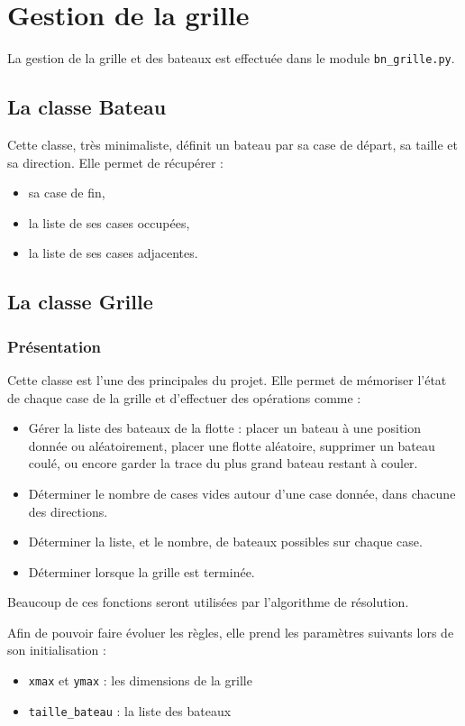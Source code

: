 \chapter{Gestion de la grille}

La gestion de la grille et des bateaux est effectuée dans le module \texttt{bn\_grille.py}.

\section{La classe Bateau}
Cette classe, très minimaliste, définit un bateau par sa case de départ, sa taille et sa direction. Elle permet de récupérer :
\begin{itemize}
\item sa case de fin,
\item la liste de ses cases occupées,
\item la liste de ses cases adjacentes.
\end{itemize}

\section{La classe Grille}
\subsection{Présentation}
Cette classe est l'une des principales du projet. 
Elle permet de mémoriser l'état de chaque case de la grille et d'effectuer des opérations comme :
\begin{itemize}
\item Gérer la liste des bateaux de la flotte : placer un bateau à une position donnée ou aléatoirement, placer une flotte aléatoire, supprimer un bateau coulé, ou encore garder la trace du plus grand bateau restant à couler.
\item Déterminer le nombre de cases vides autour d'une case donnée, dans chacune des directions.
\item Déterminer la liste, et le nombre, de bateaux possibles sur chaque case.
\item Déterminer lorsque la grille est terminée.
\end{itemize}
Beaucoup de ces fonctions seront utilisées par l'algorithme de résolution.

Afin de pouvoir faire évoluer les règles, elle prend les paramètres suivants lors de son initialisation :
\begin{itemize}
\item \texttt{xmax} et \texttt{ymax} : les dimensions de la grille
\item \texttt{taille\_bateau} : la liste des bateaux
\end{itemize}

